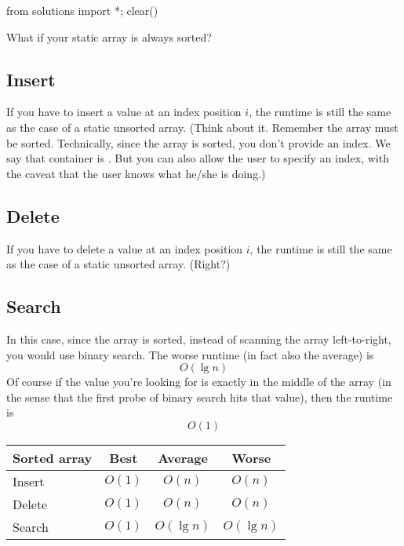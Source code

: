 \begin{python0}
from solutions import *; clear()
\end{python0}

What if your static array is always sorted?

\subsection{Insert}

If you have to insert a value at an index position $i$,
the runtime is still the same as the case of a static unsorted array.
(Think about it. Remember the array must be sorted.
Technically, since the array is sorted, you don't provide an
index. We say that container is .
But you can also allow the user to specify an index,
with the caveat that the user knows what he/she is doing.)

\subsection{Delete}

If you have to delete a value at an index position $i$,
the runtime is still the same as the case of a static unsorted array.
(Right?)

\subsection{Search}

In this case, since the array is sorted, instead of scanning the
array left-to-right, you would use binary search.
The worse runtime (in fact also the average) is
\[
O(\lg n)
\]
Of course if the value you're looking for is exactly in the middle of the
array (in the sense that the first probe of binary search hits that value),
then the runtime is
\[
O(1)
\]
\begin{longtable}{|l|c|c|c|}
\hline
Sorted array & Best   & Average      & Worse  \\* 
\hline\hline
Insert       & $O(1)$ & $O(n)$       & $O(n)$ \\*
Delete       & $O(1)$ & $O(n)$       & $O(n)$ \\*
Search       & $O(1)$ & $O(\lg n)$ & $O(\lg n)$ \\* 
\hline
\end{longtable}





